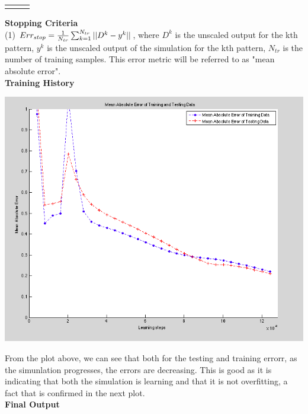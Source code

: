 \documentclass[epsfig]{article}
\begin{document}
\begin{table}[htbp]
{\begin{tabular}{p{4cm} p{.05cm} p{8cm}}
 \bottomrule \noalign{\smallskip}
 
  \end{tabular}
   } %
\end{table}
\textbf{Stopping Criteria}\\
(1) $ Err_{stop} = {1\over{N_{tr}}}\sum_{k=1}^{N_{tr}} ||D^k-y^k||$\label{err-stop}, where $D^k$ is the unscaled output for the kth  pattern, $y^k$ is the unscaled output of the simulation for the kth  pattern, $N_{tr}$ is the number of training samples. This error metric will be referred to as "mean absolute error".\\
\newpage
\textbf{Training History}\\
\begin{center}
\includegraphics[scale=0.4]{pic1.png}\\
\end{center}
From the plot above, we can see that both for the testing and training errorr, as the simunlation progresses, the errors are decreasing. This is good as it is indicating that both the simulation is learning and that it is not overfitting, a fact that is confirmed in the next plot.\\
\textbf{Final Output}
\end{document}
